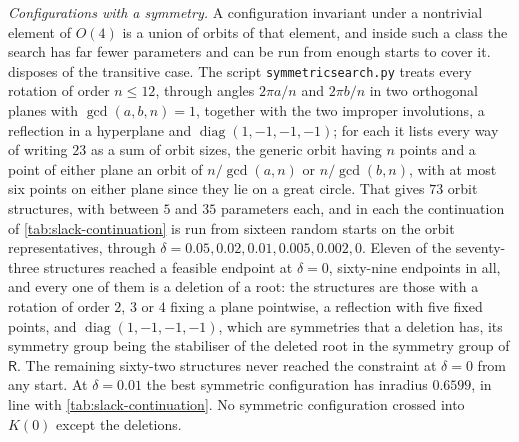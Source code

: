 \documentclass[11pt,reqno]{amsart}
\renewcommand{\_}{\origunderscore\allowbreak}
\numberwithin{equation}{section}
\theoremstyle{plain}
\theoremstyle{definition}
\theoremstyle{remark}
\newcommand{\Rt}{\mathsf{R}}                 %
\DeclareMathOperator{\diag}{diag}
\begin{document}
\smallskip\noindent\textit{Configurations with a symmetry.}
A configuration invariant under a nontrivial element of $O(4)$ is a
union of orbits of that element, and inside such a class the search has
far fewer parameters and can be run from enough starts to cover it.
 disposes of the transitive case. The script
\texttt{symmetric\_search.py} treats every rotation of order $n\le12$,
through angles $2\pi a/n$ and $2\pi b/n$ in two orthogonal planes with
$\gcd(a,b,n)=1$, together with the two improper involutions, a
reflection in a hyperplane and $\diag(1,-1,-1,-1)$; for each it lists
every way of writing $23$ as a sum of orbit sizes, the generic orbit
having $n$ points and a point of either plane an orbit of $n/\gcd(a,n)$
or $n/\gcd(b,n)$, with at most six points on either plane since they lie
on a great circle. That gives $73$ orbit structures, with between $5$
and $35$ parameters each, and in each the continuation of
\cref{tab:slack-continuation} is run from sixteen random starts on the
orbit representatives, through $\delta=0.05,0.02,0.01,0.005,0.002,0$.
Eleven of the seventy-three structures reached a feasible endpoint at
$\delta=0$, sixty-nine endpoints in all, and every one of them is a
deletion of a root: the structures are those with a rotation of order
$2$, $3$ or $4$ fixing a plane pointwise, a reflection with five fixed
points, and $\diag(1,-1,-1,-1)$, which are symmetries that a deletion
has, its symmetry group being the stabiliser of the deleted root in the
symmetry group of $\Rt$. The remaining sixty-two structures never reached
the constraint at $\delta=0$ from any start. At $\delta=0.01$ the best
symmetric configuration has inradius $0.6599$, in line with
\cref{tab:slack-continuation}. No symmetric configuration crossed into
$K(0)$ except the deletions.
\end{document}
